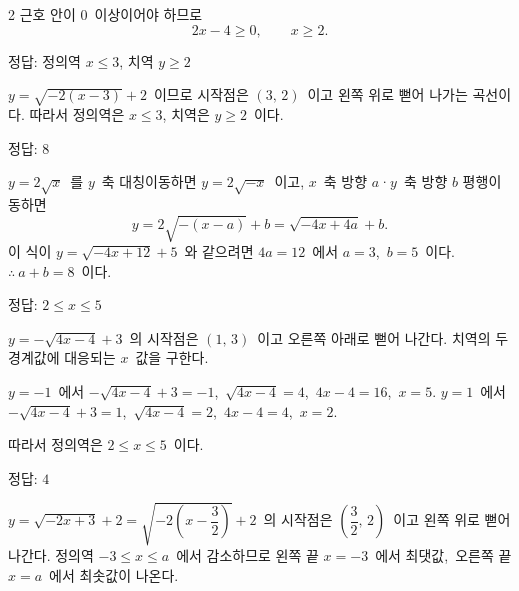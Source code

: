 \documentclass[10pt,fleqn]{article}
\begin{document}
\begin{multicols*}{2}
근호 안이 $0$\ 이상이어야 하므로
\[ 2x-4 \ge 0,\qquad x \ge 2. \]

\begin{dmanswerbox}
정답: 정의역 $x \le 3$, 치역 $y \ge 2$
\end{dmanswerbox}

$y=\sqrt{-2(x-3)}+2$\ 이므로 시작점은 $(3,\, 2)$\ 이고 왼쪽 위로 뻗어 나가는 곡선이다. 따라서 정의역은 $x \le 3$, 치역은 $y \ge 2$\ 이다.

\begin{dmanswerbox}
정답: $8$
\end{dmanswerbox}

$y=2\sqrt{x}$\ 를 $y$\ 축 대칭이동하면 $y=2\sqrt{-x}$\ 이고, $x$\ 축 방향 $a$·$y$\ 축 방향 $b$ 평행이동하면
$$y=2\sqrt{-(x-a)}+b=\sqrt{-4x+4a}+b.$$
이 식이 $y=\sqrt{-4x+12}+5$\ 와 같으려면 $4a=12$\ 에서 $a=3$,\ $b=5$\ 이다. $\therefore\ a+b=8$\ 이다.

\begin{dmanswerbox}
정답: $2 \le x \le 5$
\end{dmanswerbox}

$y=-\sqrt{4x-4}+3$\ 의 시작점은 $(1,\, 3)$\ 이고 오른쪽 아래로 뻗어 나간다. 치역의 두 경계값에 대응되는 $x$\ 값을 구한다.

$y=-1$\ 에서 $-\sqrt{4x-4}+3=-1$,\ $\sqrt{4x-4}=4$,\ $4x-4=16$,\ $x=5$.
$y=1$\ 에서 $-\sqrt{4x-4}+3=1$,\ $\sqrt{4x-4}=2$,\ $4x-4=4$,\ $x=2$.

따라서 정의역은 $2 \le x \le 5$\ 이다.

\begin{dmanswerbox}
정답: $4$
\end{dmanswerbox}

$y=\sqrt{-2x+3}+2=\sqrt{-2\!\left(x-\dfrac{3}{2}\right)}+2$\ 의 시작점은 $\left(\dfrac{3}{2},\, 2\right)$\ 이고 왼쪽 위로 뻗어 나간다. 정의역 $-3 \le x \le a$\ 에서 감소하므로 왼쪽 끝 $x=-3$\ 에서 최댓값,\ 오른쪽 끝 $x=a$\ 에서 최솟값이 나온다.


\end{multicols*}
\end{document}
